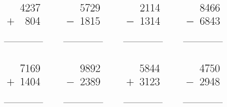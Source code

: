 \documentclass[14pt,a4paper,sans, final]{article}
\begin{document}
\[
\huge 
\begin{array}{cccc}
\begin{array}{lr}
 & 4237 \\
+ & 804 \\
&\\
\hline
&\qquad 
\end{array}\qquad

\begin{array}{lr}
 & 5729 \\
- & 1815 \\
&\\
\hline
&\qquad 
\end{array}\qquad

\begin{array}{lr}
 & 2114 \\
- & 1314 \\
&\\
\hline
&\qquad 
\end{array}\qquad

\begin{array}{lr}
 & 8466 \\
- & 6843 \\
&\\
\hline
&\qquad 
\end{array}\qquad

\end{array}
\]

\[
\huge 
\begin{array}{cccc}
\begin{array}{lr}
 & 7169 \\
+ & 1404 \\
&\\
\hline
&\qquad 
\end{array}\qquad

\begin{array}{lr}
 & 9892 \\
- & 2389 \\
&\\
\hline
&\qquad 
\end{array}\qquad

\begin{array}{lr}
 & 5844 \\
+ & 3123 \\
&\\
\hline
&\qquad 
\end{array}\qquad

\begin{array}{lr}
 & 4750 \\
- & 2948 \\
&\\
\hline
&\qquad 
\end{array}\qquad

\end{array}
\]
\end{document}
